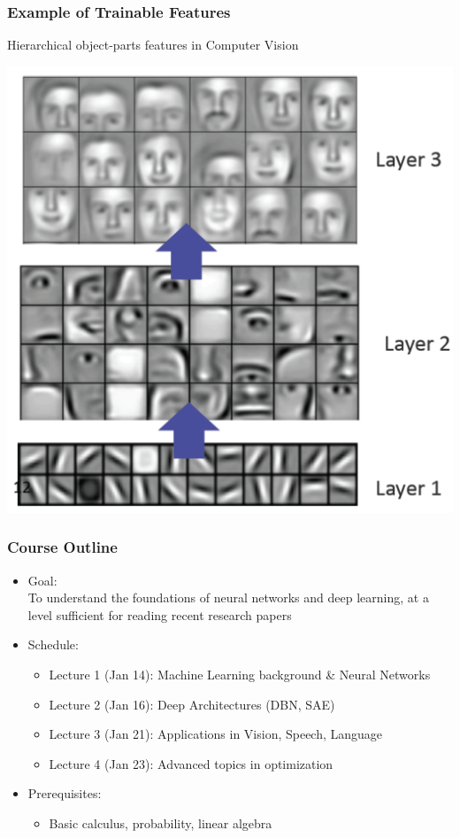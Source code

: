 \documentclass{beamer}
\newcommand{\bi}{\begin{itemize}}
\newcommand{\ei}{\end{itemize}}
\begin{document}
\begin{frame}
\frametitle{Example of Trainable Features }
Hierarchical object-parts features in Computer Vision \cite{lee09convolutional}
\centerline{\includegraphics[scale=0.35]{figs/lee09example}}
\end{frame}


\begin{frame}
\frametitle{Course Outline}
\bi
\item Goal:\\To understand the foundations of neural networks and deep learning, at a level sufficient for reading recent research papers
\pause
\item Schedule: 
	\bi
	\item Lecture 1 (Jan 14): Machine Learning background \& Neural Networks
	\item Lecture 2 (Jan 16): Deep Architectures (DBN, SAE)
	\item Lecture 3 (Jan 21): Applications in Vision, Speech, Language
	\item Lecture 4 (Jan 23): Advanced topics in optimization
	\ei
\pause
\item Prerequisites: 
	\bi
	\item Basic calculus, probability, linear algebra
	\ei
\ei
\end{frame}
\end{document}
